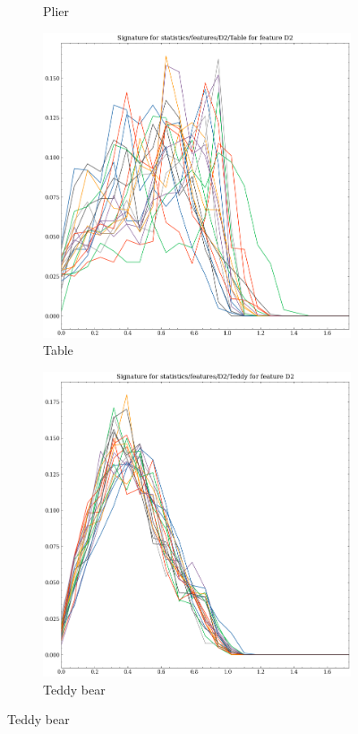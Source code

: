 \begin{figure}
\begin{subfigure}[b]{0.23\textwidth}
        \caption{Plier}
    \end{subfigure}
    \hfill
    \begin{subfigure}[b]{0.23\textwidth}
        \includegraphics[width=\textwidth]{assets/feature_extraction/D2/Table.png}
        \caption{Table}
    \end{subfigure}
    \hfill
    \begin{subfigure}[b]{0.23\textwidth}
        \includegraphics[width=\textwidth]{assets/feature_extraction/D2/Teddy.png}
        \caption{Teddy bear}
    \end{subfigure}
    \hfill


\end{figure}
